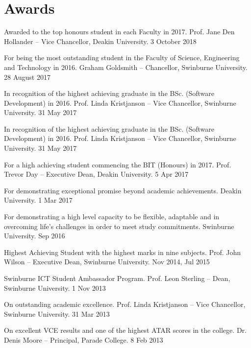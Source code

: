 \section{Awards}

{Awarded to the top honours student in each Faculty in 2017.}
{Prof. Jane Den Hollander -- Vice Chancellor, Deakin University.}
{3 October 2018}

{For being the most outstanding student in the Faculty of Science, Engineering and Technology in 2016.}
{Graham Goldsmith -- Chancellor, Swinburne University.}
{28 August 2017}

{In recognition of the highest achieving graduate in the BSc. (Software Development) in 2016.}
{Prof. Linda Kristjanson -- Vice Chancellor, Swinburne University.}
{31 May 2017}

{In recognition of the highest achieving graduate in the BSc. (Software Development) in 2016.}
{Prof. Linda Kristjanson -- Vice Chancellor, Swinburne University.}
{31 May 2017}

\clearpage

{For a high achieving student commencing the BIT (Honours) in 2017.}
{Prof. Trevor Day -- Executive Dean, Deakin University.}
{5 Apr 2017}

{For demonstrating exceptional promise beyond academic achievements.}
{Deakin University.}
{1 Mar 2017}


{For demonstrating a high level capacity to be flexible, adaptable and in overcoming life's challenges in order to meet study commitments.}
{Swinburne University.}
{Sep 2016}

{Highest Achieving Student with the highest marks in nine subjects.}
{Prof. John Wilson -- Executive Dean, Swinburne University.}
{Nov 2014, Jul 2015}

{Swinburne ICT Student Ambassador Program.}
{Prof. Leon Sterling -- Dean, Swinburne University.}
{1 Nov 2013}

{On outstanding academic excellence.}
{Prof. Linda Kristjanson -- Vice Chancellor, Swinburne University.}
{31 Mar 2013}

{On excellent VCE results and one of the highest ATAR scores in the college.}
{Dr. Denis Moore -- Principal, Parade College.}
{8 Feb 2013}
